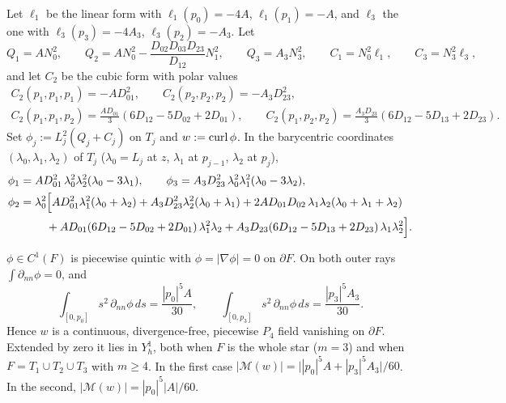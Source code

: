 \begin{definition}[Witness]\label{m3:wit}
Let $\ell_1$ be the linear form with $\ell_1(p_0)=-4A$, $\ell_1(p_1)=-A$, and $\ell_3$ the one with $\ell_3(p_3)=-4A_3$, $\ell_3(p_2)=-A_3$. Let
\[
Q_1=AN_0^2,\qquad Q_2=AN_0^2-\frac{D_{02}D_{03}D_{23}}{D_{12}}N_1^2,\qquad Q_3=A_3N_3^2,\qquad C_1=N_0^2\ell_1,\qquad C_3=N_3^2\ell_3,
\]
and let $C_2$ be the cubic form with polar values
\begin{gather*}
C_2(p_1,p_1,p_1)=-AD_{01}^2,\qquad C_2(p_2,p_2,p_2)=-A_3D_{23}^2,\\
C_2(p_1,p_1,p_2)=\tfrac{A D_{01}}{3}(6D_{12}-5D_{02}+2D_{01}),\qquad C_2(p_1,p_2,p_2)=\tfrac{A_3D_{23}}{3}(6D_{12}-5D_{13}+2D_{23}).
\end{gather*}
Set $\phi_j:=L_j^2(Q_j+C_j)$ on $T_j$ and $w:=\operatorname{curl}\phi$. In the barycentric coordinates $(\lambda_0,\lambda_1,\lambda_2)$ of $T_j$ ($\lambda_0=L_j$ at $z$, $\lambda_1$ at $p_{j-1}$, $\lambda_2$ at $p_j$),
\begin{align*}
\phi_1&=AD_{01}^2\,\lambda_0^2\lambda_2^2(\lambda_0-3\lambda_1),\qquad \phi_3=A_3D_{23}^2\,\lambda_0^2\lambda_1^2(\lambda_0-3\lambda_2),\\
\phi_2&=\lambda_0^2\Bigl[AD_{01}^2\lambda_1^2(\lambda_0+\lambda_2)+A_3D_{23}^2\lambda_2^2(\lambda_0+\lambda_1)+2AD_{01}D_{02}\,\lambda_1\lambda_2(\lambda_0+\lambda_1+\lambda_2)\\
&\qquad\ +AD_{01}(6D_{12}-5D_{02}+2D_{01})\,\lambda_1^2\lambda_2+A_3D_{23}(6D_{12}-5D_{13}+2D_{23})\,\lambda_1\lambda_2^2\Bigr].
\end{align*}
\end{definition}

\begin{lemma}\label{m3:witlem}
$\phi\in C^1(F)$ is piecewise quintic with $\phi=|\nabla\phi|=0$ on $\partial F$. On both outer rays $\int\partial_{nn}\phi=0$, and
\[
\int_{[0,p_0]}s^2\,\partial_{nn}\phi\,ds=\frac{|p_0|^5A}{30},\qquad \int_{[0,p_3]}s^2\,\partial_{nn}\phi\,ds=\frac{|p_3|^5A_3}{30}.
\]
Hence $w$ is a continuous, divergence-free, piecewise $P_4$ field vanishing on $\partial F$. Extended by zero it lies in $Y_h^1$, both when $F$ is the whole star ($m=3$) and when $F=T_1\cup T_2\cup T_3$ with $m\ge4$. In the first case $|\mathcal M(w)|=\bigl||p_0|^5A+|p_3|^5A_3\bigr|/60$. In the second, $|\mathcal M(w)|=|p_0|^5|A|/60$.
\end{lemma}

